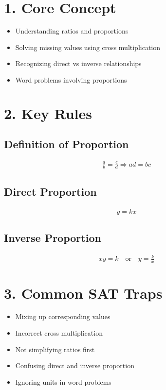 

\section*{1. Core Concept}
\begin{itemize}
    \item Understanding ratios and proportions
    \item Solving missing values using cross multiplication
    \item Recognizing direct vs inverse relationships
    \item Word problems involving proportions
\end{itemize}

\section*{2. Key Rules}

\subsection*{Definition of Proportion}
\begin{align*}
\frac{a}{b} = \frac{c}{d} \Rightarrow ad = bc
\end{align*}

\subsection*{Direct Proportion}
\begin{align*}
y = kx
\end{align*}

\subsection*{Inverse Proportion}
\begin{align*}
xy = k \quad \text{or} \quad y = \frac{k}{x}
\end{align*}

\section*{3. Common SAT Traps}
\begin{itemize}
    \item Mixing up corresponding values
    \item Incorrect cross multiplication
    \item Not simplifying ratios first
    \item Confusing direct and inverse proportion
    \item Ignoring units in word problems
\end{itemize}


